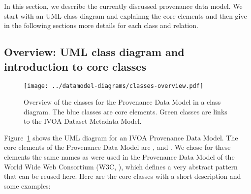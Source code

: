 In this section, we describe the currently discussed provenance data model. We 
start with an UML class diagram and explainng the core elements and then give 
in the following sections more details for each class and relation.

\subsection{Overview: UML class diagram and introduction to core classes}

\begin{figure}[h]
\centering
\texttt{[image: ../datamodel-diagrams/classes-overview.pdf]}
\caption{Overview of the classes for the Provenance Data Model in a class diagram. The blue classes are core elements.
Green classes are links to the IVOA Dataset Metadata Model.}
\label{fig:classdiagram}
\end{figure}



Figure~\ref{fig:classdiagram} shows the UML diagram for an IVOA Provenance Data
Model.
The core elements of the Provenance Data Model are ,  and . 
We chose for these elements the same names as were used in the Provenance Data 
Model of the World Wide Web Consortium (W3C, \citealt{std:W3CProvDM}), which defines 
a very abstract pattern that can be reused here. Here are the core classes with 
a short description and some examples:

